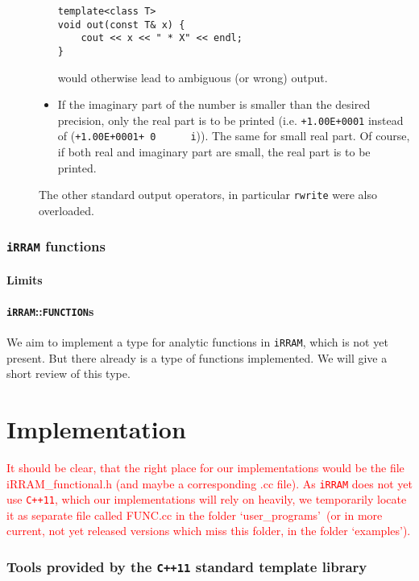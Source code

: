 \documentclass{article}
\newcommand{\irram}{\texttt{iRRAM}\xspace}
\newcommand{\ccOx}{\texttt{C++11}\xspace}
\newcommand{\ir}[1]{\texttt{#1}}
\newcommand{\code}[1]{\texttt{#1}}
\newcommand{\temp}[1]{\textcolor{red}{#1}}
\begin{document}
\begin{description}
\begin{itemize}
\begin{lstlisting}
template<class T>
void out(const T& x) {
	cout << x << " * X" << endl;
}
\end{lstlisting}
would otherwise lead to ambiguous (or wrong) output.
\item If the imaginary part of the number is smaller than the desired precision, only the real part is to be printed (i.e. \code{+1.00E+0001} instead of (\code{+1.00E+0001+ 0 \ \ \ \ \  i})). The same for small real part. Of course, if both real and imaginary part are small, the real part is to be printed.
\end{itemize}
The other standard output operators, in particular \ir{rwrite} were also overloaded.
\end{description}

\section{\irram functions}

\subsection{Limits}

\subsection{\irram::\ir{FUNCTION}s}

We aim to implement a type for analytic functions in \irram, which is not yet present. But there already is a type of functions implemented. We will give a short review of this type.

\part{Implementation}

\temp{It should be clear, that the right place for our implementations would be the file iRRAM\_functional.h (and maybe a corresponding .cc file). As \irram does not yet use \ccOx, which our implementations will rely on heavily, we temporarily locate it as separate file called FUNC.cc in the folder \lq user\_programs\rq\ (or in more current, not yet released versions which miss this folder, in the folder \lq examples\rq).}

\section{Tools provided by the \ccOx standard template library}
\end{document}
